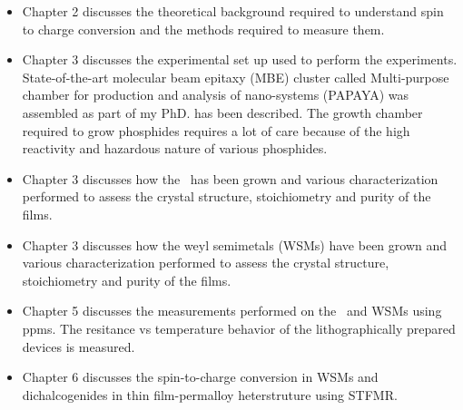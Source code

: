 \begin{itemize}
    \item Chapter 2 discusses the theoretical background required to 
    understand spin to charge conversion and the methods required to measure them.
    \item Chapter 3 discusses the experimental set up used to perform the experiments. 
    State-of-the-art molecular beam epitaxy (MBE) cluster called Multi-purpose chamber 
    for production and analysis of nano-systems (PAPAYA) was assembled as part of my PhD.
    has been described. The growth chamber required to grow phosphides requires a lot of 
    care because of the high reactivity and hazardous nature of various phosphides.
    \item Chapter 3 discusses how the \nbse\ has been grown and various characterization
    performed to assess the crystal structure, stoichiometry and purity of the films.
    \item Chapter 3 discusses how the weyl semimetals (WSMs) have been grown and various characterization
    performed to assess the crystal structure, stoichiometry and purity of the films.
    \item Chapter 5 discusses the measurements performed on the \nbse\ and WSMs using ppms.
    The resitance vs temperature behavior of the lithographically prepared devices
    is measured. 
    \item Chapter 6 discusses the spin-to-charge conversion in WSMs and dichalcogenides
    in thin film-permalloy heterstruture using STFMR.

\end{itemize}
